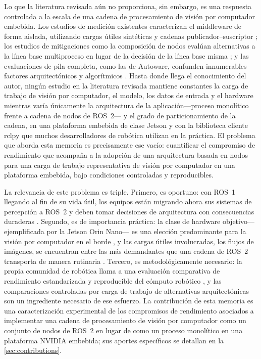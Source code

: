 Lo que la literatura revisada aún no proporciona, sin embargo, es una
respuesta controlada a la escala de una cadena de procesamiento de visión
por computador embebida. Los estudios de medición existentes caracterizan el
middleware de forma aislada, utilizando cargas útiles sintéticas y cadenas
publicador--suscriptor \cite{maruyama2016, kronauer2021, kamiya2025,
luo2025, zhang2024}; los estudios de mitigaciones como la composición de
nodos evalúan alternativas a la línea base multiproceso en lugar de la
decisión de la línea base misma \cite{macenski2023}; y las evaluaciones de
pila completa, como las de Autoware, confunden innumerables factores
arquitectónicos y algorítmicos \cite{betz2023a, betz2024}. Hasta donde llega
el conocimiento del autor, ningún estudio en la literatura revisada mantiene
constantes la carga de trabajo de visión por computador, el modelo, los
datos de entrada y el hardware mientras varía únicamente la arquitectura de
la aplicación---proceso monolítico frente a cadena de nodos de ROS~2--- y el
grado de particionamiento de la cadena, en una plataforma embebida de clase
Jetson y con la biblioteca cliente rclpy que muchos desarrolladores de
robótica utilizan en la práctica.
El problema que aborda esta memoria es precisamente ese vacío: cuantificar el
compromiso de rendimiento que acompaña a la adopción de una arquitectura
basada en nodos para una carga de trabajo representativa de visión por
computador en una plataforma embebida, bajo condiciones controladas y
reproducibles.

La relevancia de este problema es triple. Primero, es oportuno: con ROS~1
llegando al fin de su vida útil, los equipos están migrando ahora sus
sistemas de percepción a ROS~2 y deben tomar decisiones de arquitectura con
consecuencias duraderas \cite{portugal2025}. Segundo, es de importancia
práctica: la clase de hardware objetivo---ejemplificada por la Jetson Orin
Nano--- es una elección predominante para la visión por computador en el
borde \cite{scalcon2024, alqahtani2026}, y las cargas útiles involucradas,
los flujos de imágenes, se encuentran entre las más demandantes que una
cadena de ROS~2 transporta de manera rutinaria \cite{kamiya2025,
macenski2023}. Tercero, es metodológicamente necesario: la propia comunidad
de robótica llama a una evaluación comparativa de rendimiento estandarizada
y reproducible del cómputo robótico \cite{mayoral-vilches2024}, y las
comparaciones controladas por carga de trabajo de alternativas
arquitectónicas son un ingrediente necesario de ese esfuerzo. La
contribución de esta memoria es una caracterización experimental de los
compromisos de rendimiento asociados a implementar una cadena de
procesamiento de visión por computador como un conjunto de nodos de ROS~2 en
lugar de como un proceso monolítico en una plataforma NVIDIA embebida; sus
aportes específicos se detallan en la \cref{sec:contributions}.

